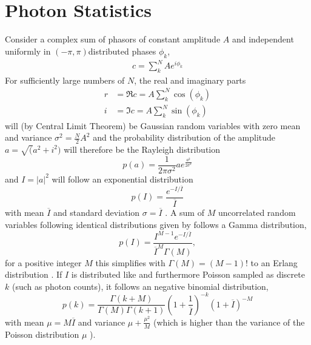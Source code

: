 \section{Photon Statistics}
Consider a complex sum of phasors of constant amplitude $A$ and independent uniformly in $(-\pi,\pi)$distributed phases $\phi_k$,
\begin{align}
	c=\sum^N_k A e^{i\phi_k}
\end{align}
For sufficiently large numbers of $N$, the real and imaginary parts
\begin{align*}
	r&=\Re c =  A \sum^N_k \cos(\phi_k)\\
	i&= \Im c =A \sum^N_k \sin(\phi_k)
\end{align*}
will (by Central Limit Theorem) be Gaussian random variables with zero mean and variance $\sigma^2=\frac{N}{2}A^2$ and the probability distribution of the amplitude $a=\sqrt(a^2+i^2)$ will  therefore be the Rayleigh distribution
\begin{equation}
	p(a)=\frac{1}{2\pi\sigma^2} a e^{\frac{a^2}{2\sigma^2}}
\end{equation}
and  $I=\left|a\right|^2$ will  follow an exponential distribution
\begin{equation}
	\label{eq:expdistr}
	p(I)=\frac{ e^{-I/\overline{I}}}{\overline{I}}
\end{equation} 
with mean $\overline{I}$ and standard deviation $\sigma=\overline{I}$  \cite{goodman2000,goodman1976}.
A sum of $M$ uncorrelated random variables following identical distributions given by  follows a Gamma distribution,
\begin{equation}
	\label{eq:gammadistr}
	p(I)=\frac{I^{M-1} e^{-I/\overline{I}}} {\overline{I}^M \Gamma(M)},
\end{equation}
for a positive integer $M$ this simplifies with $\Gamma(M)=(M-1)!$ to an Erlang distribution  \cite{forbes2010,trost2020}.
If $I$ is distributed like  and furthermore Poisson sampled as discrete $k$ (such as photon counts), it follows  an negative binomial distribution,
\cite{trost2020,mandel1959,holmes2019}
\begin{equation}
	p(k)=
	\frac{\Gamma(k+M)}{\Gamma(M)\Gamma(k+1) }
	\left( 1+\frac{1}{\overline{I}}
	\right)^{-k}
	\left( 1+\overline{I}
	\right)^{-M}
	\label{eq:negbinomialdist}
\end{equation}
with mean $\mu=M\overline{I}$ and variance $\mu+\frac{\mu^2}{M}$ (which is higher than the variance of the Poisson distribution $\mu$ ).


